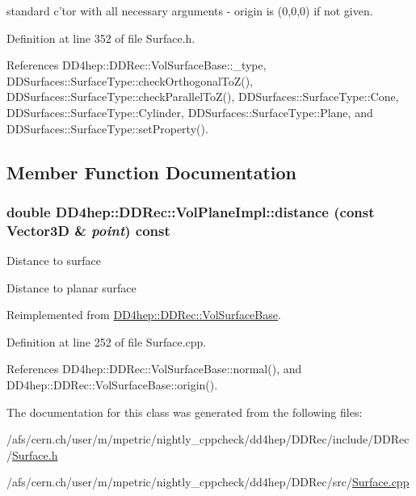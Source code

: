 standard c'tor with all necessary arguments -\/ origin is (0,0,0) if not given. 

Definition at line 352 of file Surface.h.

References DD4hep::DDRec::VolSurfaceBase::\_\-type, DDSurfaces::SurfaceType::checkOrthogonalToZ(), DDSurfaces::SurfaceType::checkParallelToZ(), DDSurfaces::SurfaceType::Cone, DDSurfaces::SurfaceType::Cylinder, DDSurfaces::SurfaceType::Plane, and DDSurfaces::SurfaceType::setProperty().

\subsection{Member Function Documentation}
\hypertarget{class_d_d4hep_1_1_d_d_rec_1_1_vol_plane_impl_ad75ba6e93463cf8ce312d312111c8391}{
\subsubsection[{distance}]{\setlength{\rightskip}{0pt plus 5cm}double DD4hep::DDRec::VolPlaneImpl::distance (const {\bf Vector3D} \& {\em point}) const}}
\label{class_d_d4hep_1_1_d_d_rec_1_1_vol_plane_impl_ad75ba6e93463cf8ce312d312111c8391}
Distance to surface

Distance to planar surface 

Reimplemented from \hyperlink{class_d_d4hep_1_1_d_d_rec_1_1_vol_surface_base_afb85bf6e8e6b87fb52e67e26609b1048}{DD4hep::DDRec::VolSurfaceBase}.

Definition at line 252 of file Surface.cpp.

References DD4hep::DDRec::VolSurfaceBase::normal(), and DD4hep::DDRec::VolSurfaceBase::origin().

The documentation for this class was generated from the following files:\begin{DoxyCompactItemize}
\item 
/afs/cern.ch/user/m/mpetric/nightly\_\-cppcheck/dd4hep/DDRec/include/DDRec/\hyperlink{_surface_8h}{Surface.h}\item 
/afs/cern.ch/user/m/mpetric/nightly\_\-cppcheck/dd4hep/DDRec/src/\hyperlink{_surface_8cpp}{Surface.cpp}\end{DoxyCompactItemize}
